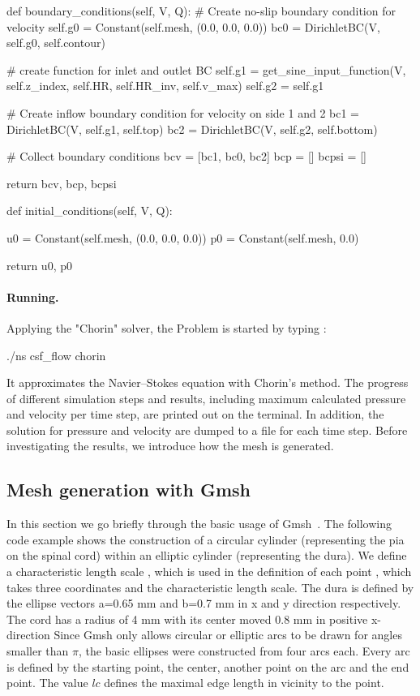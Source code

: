 \begin{python}
def boundary_conditions(self, V, Q):
	# Create no-slip boundary condition for velocity
	self.g0 = Constant(self.mesh, (0.0, 0.0, 0.0))
	bc0 = DirichletBC(V, self.g0, self.contour)

	# create function for inlet and outlet BC
	self.g1 = get_sine_input_function(V, self.z_index, self.HR, self.HR_inv, self.v_max)
	self.g2 = self.g1

	# Create inflow boundary condition for velocity on side 1 and 2
	bc1 = DirichletBC(V, self.g1, self.top)
	bc2 = DirichletBC(V, self.g2, self.bottom)

	# Collect boundary conditions
	bcv = [bc1, bc0, bc2]
	bcp = []
	bcpsi = []

	return bcv, bcp, bcpsi

def initial_conditions(self, V, Q):

	u0 = Constant(self.mesh, (0.0, 0.0, 0.0))
	p0 = Constant(self.mesh, 0.0)

	return u0, p0
\end{python}


\paragraph{Running.}
Applying the "Chorin" solver, the Problem is started by typing :
\begin{bash}
./ns csf_flow chorin
\end{bash}

It approximates the Navier--Stokes equation with Chorin's method. The progress of different simulation steps and results, including maximum calculated pressure and velocity per time step, are printed out on the terminal. In addition, the solution for pressure and velocity are dumped to a file for each  time step. Before investigating the results, we introduce how the mesh is generated.

\subsection{Mesh generation with Gmsh} 

In this section we go briefly through the basic usage of 
Gmsh~\citep{GeuzaineRemacle}.  The following code example shows the construction of a circular cylinder (representing the pia on the spinal cord) within an elliptic cylinder (representing the dura). 
We define a characteristic length scale , which is used in the definition of each point , which 
takes three coordinates and the characteristic length scale. 
The dura is defined by the ellipse vectors a=0.65 mm and b=0.7 mm in x and y direction respectively. The cord has a radius of 4 mm with its center moved 0.8 mm in positive x-direction  Since Gmsh only allows circular or elliptic arcs to be drawn for angles smaller than $\pi$, the basic ellipses were constructed from four arcs each. Every arc is defined by the starting point, the center, another point on the arc and the end point. The value $lc$  defines the maximal edge length in vicinity to the point.

